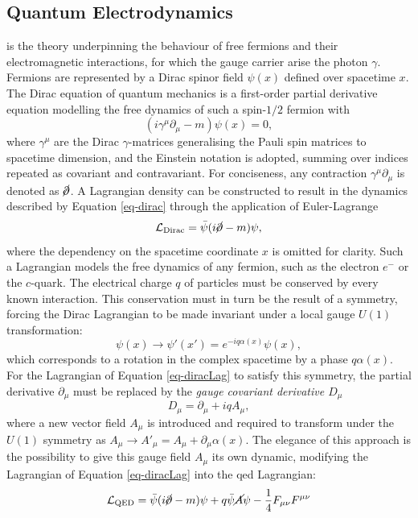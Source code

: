 \subsection{Quantum Electrodynamics}\label{subsec-QED}
 is the theory underpinning the behaviour of free fermions and their electromagnetic interactions, for which the gauge carrier arise the photon $\gamma$. Fermions are represented by a Dirac spinor field $\psi(x)$ defined over spacetime $x$. The Dirac equation of quantum mechanics is a first-order partial derivative equation modelling the free dynamics of such a spin-$1/2$ fermion with
\begin{equation}\label{eq-dirac}
    (i\gamma^{\mu} \partial_{\mu} - m) \psi(x) = 0,
\end{equation}
where $\gamma^{\mu}$ are the Dirac $\gamma$-matrices generalising the Pauli spin matrices to spacetime dimension, and the Einstein notation is adopted, summing over indices repeated as covariant and contravariant. For conciseness, any contraction $\gamma^{\mu} \partial_{\mu}$ is denoted as $\cancel{\partial}$. A Lagrangian density can be constructed to result in the dynamics described by Equation \ref{eq-dirac} through the application of Euler-Lagrange
\begin{equation}\label{eq-diracLag}
   \mathcal{L}_{\text{Dirac}} = \bar{\psi} (i \cancel{\partial}- m) \psi,
\end{equation}
where the dependency on the spacetime coordinate $x$ is omitted for clarity. Such a Lagrangian models the free dynamics of any fermion, such as the electron $e^-$ or the $c$-quark. The electrical charge $q$ of particles must be conserved by every known interaction. This conservation must in turn be the result of a symmetry, forcing the Dirac Lagrangian to be made invariant under a local gauge $U(1)$ transformation:
\begin{equation}\label{eq-GaugeU1}
    \psi(x) \rightarrow \psi'(x') = e^{-iq\alpha(x)} \psi(x),
\end{equation}
which corresponds to a rotation in the complex spacetime by a phase $q\alpha(x)$. For the Lagrangian of Equation \ref{eq-diracLag} to satisfy this symmetry, the partial derivative $\partial_{\mu}$ must be replaced by the \textit{gauge covariant derivative $D_{\mu}$}
\begin{equation}\label{eq-CoDerU1}
    D_{\mu} = \partial_{\mu} + iqA_{\mu},
\end{equation}
where a new vector field $A_{\mu}$ is introduced and required to transform under the $U(1)$ symmetry as $A_{\mu} \rightarrow A'_{\mu} = A_{\mu} + \partial_{\mu} \alpha(x)$. The elegance of this approach is the possibility to give this gauge field $A_{\mu}$ its own dynamic, modifying the Lagrangian of Equation \ref{eq-diracLag} into the \gls{qed} Lagrangian: \[ \mathcal{L}_{\text{QED}} = \bar{\psi} (i \cancel{\partial}- m) \psi + q \bar{\psi} \cancel{A} \psi - \frac{1}{4} F_{\mu\nu} F^{\mu\nu} \]
